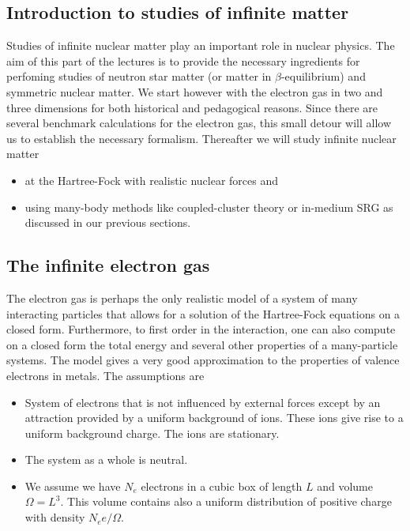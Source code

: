 \subsection{Introduction to studies of infinite matter}


Studies of infinite nuclear matter play an important role  in nuclear physics. The aim of this part of the lectures is to provide the necessary ingredients for perfoming studies of neutron star matter (or matter in $\beta$-equilibrium) and symmetric nuclear matter. We start however with the electron gas in two and three dimensions for both historical and pedagogical reasons. Since there are several benchmark calculations for the electron gas, this small detour will allow us to establish the necessary formalism. Thereafter we will study infinite nuclear matter 
\begin{itemize}
\item at the Hartree-Fock with realistic nuclear forces and

\item using many-body methods like coupled-cluster theory or in-medium SRG as discussed in our previous sections.
\end{itemize}

\noindent
\subsection{The infinite electron gas}

The electron gas is perhaps the only realistic model of a 
system of many interacting particles that allows for a solution
of the Hartree-Fock equations on a closed form. Furthermore, to first order in the interaction, one can also
compute on a closed form the total energy and several other properties of a many-particle systems. 
The model gives a very good approximation to the properties of valence electrons in metals.
The assumptions are

\begin{itemize}
 \item System of electrons that is not influenced by external forces except by an attraction provided by a uniform background of ions. These ions give rise to a uniform background charge. The ions are stationary.

 \item The system as a whole is neutral.

 \item We assume we have $N_e$ electrons in a cubic box of length $L$ and volume $\Omega=L^3$. This volume contains also a uniform distribution of positive charge with density $N_ee/\Omega$. 
\end{itemize}

